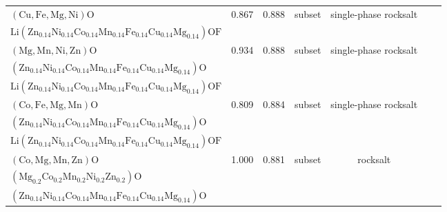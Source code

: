 \begin{table}
{\begin{tabular}{lcccccr}
$(\mathrm{Cu},\mathrm{Fe},\mathrm{Mg},\mathrm{Ni})\mathrm{O}$ & 0.867 & 0.888 & subset & single-phase rocksalt & \makecell{$(\mathrm{Zn}_{0.14}\mathrm{Ni}_{0.14}\mathrm{Co}_{0.14}\mathrm{Mn}_{0.14}\mathrm{Fe}_{0.14}\mathrm{Cu}_{0.14}\mathrm{Mg}_{0.14})\mathrm{O}$\\
$\mathrm{Li}(\mathrm{Zn}_{0.14}\mathrm{Ni}_{0.14}\mathrm{Co}_{0.14}\mathrm{Mn}_{0.14}\mathrm{Fe}_{0.14}\mathrm{Cu}_{0.14}\mathrm{Mg}_{0.14})\mathrm{OF}$} & ~\cite{Lin_MechanochemicalSynthesis_JournalofMaterialsScience_2020} \\
$(\mathrm{Mg},\mathrm{Mn},\mathrm{Ni},\mathrm{Zn})\mathrm{O}$ & 0.934 & 0.888 & subset & single-phase rocksalt & \makecell{$(\mathrm{Mg}_{0.2}\mathrm{Co}_{0.2}\mathrm{Mn}_{0.2}\mathrm{Ni}_{0.2}\mathrm{Zn}_{0.2})\mathrm{O}$\\
$(\mathrm{Zn}_{0.14}\mathrm{Ni}_{0.14}\mathrm{Co}_{0.14}\mathrm{Mn}_{0.14}\mathrm{Fe}_{0.14}\mathrm{Cu}_{0.14}\mathrm{Mg}_{0.14})\mathrm{O}$\\
$\mathrm{Li}(\mathrm{Zn}_{0.14}\mathrm{Ni}_{0.14}\mathrm{Co}_{0.14}\mathrm{Mn}_{0.14}\mathrm{Fe}_{0.14}\mathrm{Cu}_{0.14}\mathrm{Mg}_{0.14})\mathrm{OF}$} & ~\cite{Lin_MechanochemicalSynthesis_JournalofMaterialsScience_2020,Hou_ReversibilityAnodes_NanoEnergy_2024} \\
$(\mathrm{Co},\mathrm{Fe},\mathrm{Mg},\mathrm{Mn})\mathrm{O}$ & 0.809 & 0.884 & subset & single-phase rocksalt & \makecell{$(\mathrm{Co},\mathrm{Fe},\mathrm{Mg},\mathrm{Mn},\mathrm{Ni})\mathrm{O}$\\
$(\mathrm{Zn}_{0.14}\mathrm{Ni}_{0.14}\mathrm{Co}_{0.14}\mathrm{Mn}_{0.14}\mathrm{Fe}_{0.14}\mathrm{Cu}_{0.14}\mathrm{Mg}_{0.14})\mathrm{O}$\\
$\mathrm{Li}(\mathrm{Zn}_{0.14}\mathrm{Ni}_{0.14}\mathrm{Co}_{0.14}\mathrm{Mn}_{0.14}\mathrm{Fe}_{0.14}\mathrm{Cu}_{0.14}\mathrm{Mg}_{0.14})\mathrm{OF}$} &  ~\cite{Sivak_HighEntropy_PhysicalReviewLetters_2025,pu2023mg,Lin_MechanochemicalSynthesis_JournalofMaterialsScience_2020} \\
$(\mathrm{Co},\mathrm{Mg},\mathrm{Mn},\mathrm{Zn})\mathrm{O}$ & 1.000 & 0.881 & subset & rocksalt & \makecell{$\mathrm{Li}_{0.3}(\mathrm{Co},\mathrm{Cu},\mathrm{Mg},\mathrm{Mn},\mathrm{Zn})\mathrm{O}$\\
$(\mathrm{Mg}_{0.2}\mathrm{Co}_{0.2}\mathrm{Mn}_{0.2}\mathrm{Ni}_{0.2}\mathrm{Zn}_{0.2})\mathrm{O}$\\
$(\mathrm{Zn}_{0.14}\mathrm{Ni}_{0.14}\mathrm{Co}_{0.14}\mathrm{Mn}_{0.14}\mathrm{Fe}_{0.14}\mathrm{Cu}_{0.14}\mathrm{Mg}_{0.14})\mathrm{O}$} &  ~\cite{Hou_ReversibilityAnodes_NanoEnergy_2024,Biesuz_NifreeHighentropy_JournalOfMaterialsChemistryA_2022,Lin_MechanochemicalSynthesis_JournalofMaterialsScience_2020} \\

\end{tabular}}
\end{table}
